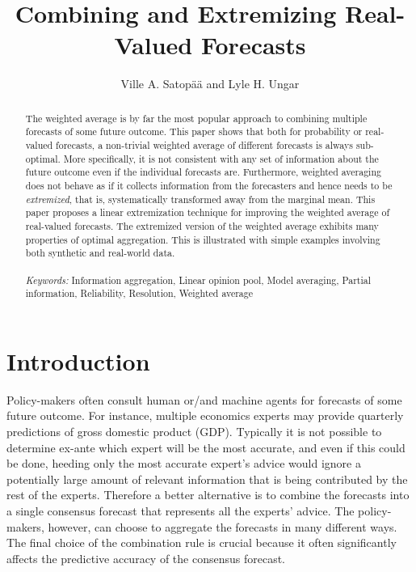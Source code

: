 \documentclass[11pt]{article}
\title{Combining and Extremizing Real-Valued Forecasts}
\author{
Ville A. Satop\"a\"a and Lyle H. Ungar}
\date{}
\theoremstyle{definition}
\theoremstyle{definition}
\begin{document}
\maketitle

\begin{abstract}

The weighted average is by far the most popular approach to combining
multiple forecasts of some future outcome. This paper shows that
both for probability or real-valued forecasts, a non-trivial weighted average
of different forecasts is always sub-optimal. More specifically, it is
not consistent with any set of information about the future outcome
even if the individual forecasts are. Furthermore, weighted averaging
does not behave as if it collects information from the forecasters and
hence needs to be \textit{extremized}, that is, 
systematically transformed away from the marginal mean. This paper
proposes a linear extremization technique for improving the weighted
average of real-valued forecasts. The extremized
version of the weighted average exhibits many properties of optimal
aggregation. This is illustrated with simple examples involving both
synthetic and real-world data. \\
\\
\textit{Keywords:} Information aggregation, Linear opinion pool, Model averaging, Partial information, Reliability, Resolution, Weighted average
\end{abstract}


\section{Introduction} \label{introduction}

Policy-makers often consult human or/and machine agents for forecasts
of some future outcome. For instance, multiple economics experts may
provide quarterly predictions of gross domestic product (GDP). Typically it is not possible to determine ex-ante which expert will be the most accurate, and even if this could be done, heeding only the most accurate expert's advice would ignore a potentially large amount of relevant information that is being contributed by the rest of the experts. Therefore a better alternative is to combine the
forecasts into a single consensus forecast that represents all the experts' advice. 
The policy-makers, however, can choose to aggregate the forecasts in many different ways. The final choice of the combination rule is crucial because it often
significantly affects the predictive accuracy of the consensus
forecast. 
\end{document}

